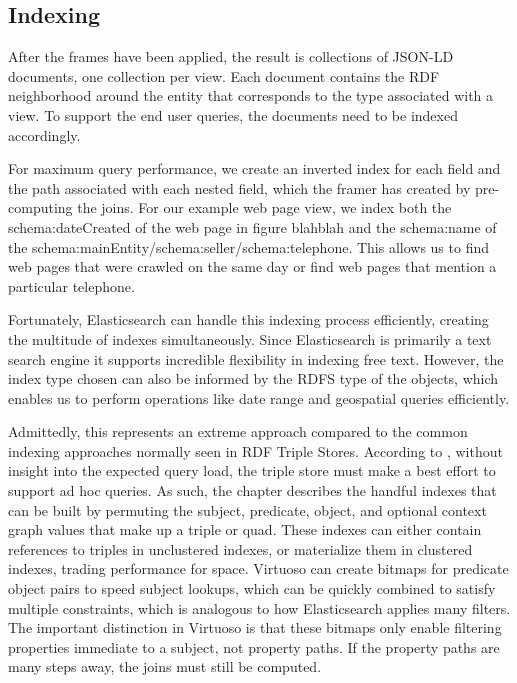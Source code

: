 \subsection{Indexing}
After the frames have been applied, the result is collections of JSON-LD documents, one collection per view.  
Each document contains the RDF neighborhood around the entity that corresponds to the type associated with a view.  
To support the end user queries, the documents need to be indexed accordingly.  

For maximum query performance, we create an inverted index for each field and the path associated with each nested field, which the framer has created by pre-computing the joins.  
For our example web page view,  we index both the schema:dateCreated of the web page in figure blahblah and the schema:name of the schema:mainEntity/schema:seller/schema:telephone.  
This allows us to find web pages that were crawled on the same day or find web pages that mention a particular telephone.  

Fortunately, Elasticsearch can handle this indexing process efficiently, creating the multitude of indexes simultaneously.  
Since Elasticsearch is primarily a text search engine it supports incredible flexibility in indexing free text.  
However, the index type chosen can also be informed by the RDFS type of the objects, which enables us to perform operations like date range and geospatial queries efficiently.

Admittedly, this represents an extreme approach compared to the common indexing approaches normally seen in RDF Triple Stores.  
According to \cite{luo2012storing}, without insight into the expected query load, the triple store must make a best effort to support ad hoc queries.  
As such, the chapter describes the handful indexes that can be built by permuting the subject, predicate, object, and optional context graph values that make up a triple or quad.
These indexes can either contain references to triples in unclustered indexes, or materialize them in clustered indexes, trading performance for space.
Virtuoso can create bitmaps for predicate object pairs to speed subject lookups, which can be quickly combined to satisfy multiple constraints, which is analogous to how Elasticsearch applies many filters. 
The important distinction in Virtuoso is that these bitmaps only enable filtering properties immediate to a subject, not property paths.
If the property paths are many steps away, the joins must still be computed.  


 